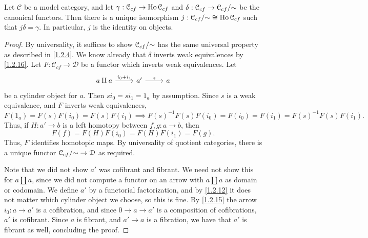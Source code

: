 \begin{corollary}\label{1.2.17}
	Let $\mathcal{C} $ be a model category, and let $\gamma : \mathcal{C} _{cf}  \to \operatorname{Ho} \mathcal{C} _{cf} $ and $\delta : \mathcal{C} _{cf}  \to \mathcal{C} _{cf} /\mathbin{\sim} $ be the canonical functors. Then there is a unique isomorphism $j : \mathcal{C} _{cf} /\mathbin{\sim} \cong \operatorname{Ho} \mathcal{C} _{cf} $ such that $j\delta=\gamma$. In particular, $j$ is the identity on objects.
\end{corollary}
\begin{proof}
	By universality, it suffices to show $\mathcal{C}_{cf}  /\mathbin{\sim} $ has the same universal property as described in \cref{1.2.4}. We know already that $\delta$ inverts weak equivalences by \cref{1.2.16}. Let $F : \mathcal{C} _{cf}  \to \mathcal{D} $ be a functor which inverts weak equivalences. Let
	\[\begin{tikzcd}[row sep = 2.5em, column sep = 2.5em]
	a\amalg a \ar[" i_0+i_1 ", r]  & a'\ar[" s ", r]  & a
	\end{tikzcd}\]
	be a cylinder object for $a$. Then $si_0=si_1=1_a$ by assumption. Since $s$ is a weak equivalence, and $F$ inverts weak equivalences,
	\[
		F(1_a)=F(s)F(i_0)=F(s)F(i_1)\implies F(s)^{-1} F(s)F(i_0)=F(i_0)=F(i_1)=F(s)^{-1} F(s)F(i_1)
	.\]
	Thus, if $H : a' \to b$ is a left homotopy between $f,g : a \to b$, then
	\[
		F(f)=F(H)F(i_0)=F(H)F(i_1)=F(g)
	.\]
	Thus, $F$ identifies homotopic maps. By universality of quotient categories, there is a unique functor $\mathcal{C} _{cf} /\mathbin{\sim} \to \mathcal{D} $ as required.

	Note that we did not show $a'$ was cofibrant and fibrant. We need not show this for $a\amalg a$, since we did not compute a functor on an arrow with $a\amalg a$ as domain or codomain. We define $a'$ by a functorial factorization, and by \cref{1.2.12} it does not matter which cylinder object we choose, so this is fine. By \cref{1.2.15} the arrow $i_0 : a \to a'$ is a cofibration, and since $0\to a \to a'$ is a composition of cofibrations, $a'$ is cofibrant. Since $a$ is fibrant, and $a'\to a$ is a fibration, we have that $a'$ is fibrant as well, concluding the proof.
\end{proof}

